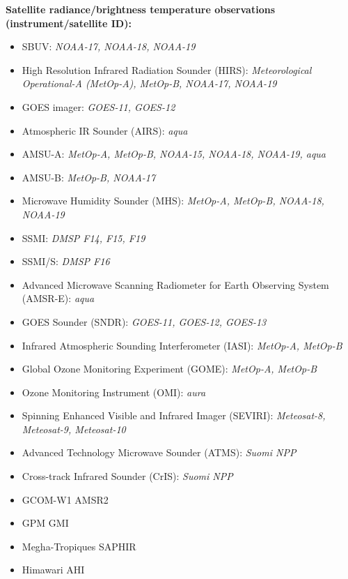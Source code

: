 \textbf{Satellite radiance/brightness temperature observations (instrument/satellite ID):}
\begin{itemize}
\item SBUV: \textit {NOAA-17, NOAA-18, NOAA-19}
\item High Resolution Infrared Radiation Sounder (HIRS): \textit {Meteorological Operational-A (MetOp-A), MetOp-B, NOAA-17, NOAA-19}
\item GOES imager: \textit {GOES-11, GOES-12}
\item Atmospheric IR Sounder (AIRS): \textit {aqua}
\item AMSU-A: \textit {MetOp-A, MetOp-B, NOAA-15, NOAA-18, NOAA-19, aqua} 
\item AMSU-B: \textit {MetOp-B, NOAA-17}
\item Microwave Humidity Sounder (MHS): \textit {MetOp-A, MetOp-B, NOAA-18, NOAA-19}
\item SSMI: \textit {DMSP F14, F15, F19}
\item SSMI/S: \textit {DMSP F16}
\item Advanced Microwave Scanning Radiometer for Earth Observing System (AMSR-E): \textit {aqua}
\item GOES Sounder (SNDR): \textit {GOES-11, GOES-12, GOES-13}
\item Infrared Atmospheric Sounding Interferometer (IASI): \textit {MetOp-A, MetOp-B}
\item Global Ozone Monitoring Experiment (GOME): \textit {MetOp-A, MetOp-B}
\item Ozone Monitoring Instrument (OMI): \textit {aura}
\item Spinning Enhanced Visible and Infrared Imager (SEVIRI): \textit {Meteosat-8, Meteosat-9, Meteosat-10}
\item Advanced Technology Microwave Sounder (ATMS): \textit {Suomi NPP}
\item Cross-track Infrared Sounder (CrIS): \textit {Suomi NPP}
\item GCOM-W1 AMSR2 
\item GPM GMI
\item Megha-Tropiques SAPHIR 
\item Himawari AHI
\end{itemize}

\setlength{\parskip}{12pt}
